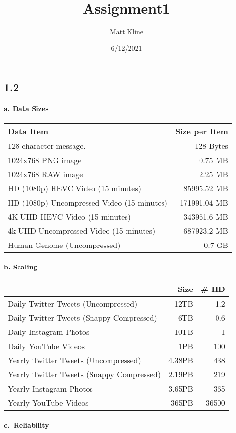 \documentclass[
]{article}
\title{Assignment1}
\author{Matt Kline}
\date{6/12/2021}
\begin{document}
\maketitle

\hypertarget{section}{%
\subsection{1.2}\label{section}}

\hypertarget{a.-data-sizes}{%
\paragraph{a. Data Sizes}\label{a.-data-sizes}}

\begin{longtable}[]{@{}lr@{}}
\toprule
Data Item & Size per Item\tabularnewline
\midrule
\endhead
128 character message. & 128 Bytes\tabularnewline
1024x768 PNG image & 0.75 MB\tabularnewline
1024x768 RAW image & 2.25 MB\tabularnewline
HD (1080p) HEVC Video (15 minutes) & 85995.52 MB\tabularnewline
HD (1080p) Uncompressed Video (15 minutes) & 171991.04 MB\tabularnewline
4K UHD HEVC Video (15 minutes) & 343961.6 MB\tabularnewline
4k UHD Uncompressed Video (15 minutes) & 687923.2 MB\tabularnewline
Human Genome (Uncompressed) & 0.7 GB\tabularnewline
\bottomrule
\end{longtable}

\hypertarget{b.-scaling}{%
\paragraph{b. Scaling}\label{b.-scaling}}

\begin{longtable}[]{@{}lrr@{}}
\toprule
& Size & \# HD\tabularnewline
\midrule
\endhead
Daily Twitter Tweets (Uncompressed) & 12TB & 1.2\tabularnewline
Daily Twitter Tweets (Snappy Compressed) & 6TB & 0.6\tabularnewline
Daily Instagram Photos & 10TB & 1\tabularnewline
Daily YouTube Videos & 1PB & 100\tabularnewline
Yearly Twitter Tweets (Uncompressed) & 4.38PB & 438\tabularnewline
Yearly Twitter Tweets (Snappy Compressed) & 2.19PB & 219\tabularnewline
Yearly Instagram Photos & 3.65PB & 365\tabularnewline
Yearly YouTube Videos & 365PB & 36500\tabularnewline
\bottomrule
\end{longtable}

\hypertarget{c.-reliability}{%
\paragraph{c.~Reliability}\label{c.-reliability}}
\end{document}
